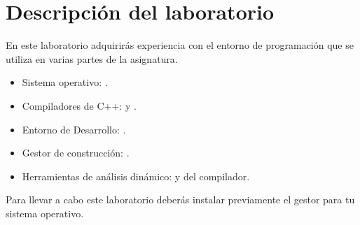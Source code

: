 \section{Descripción del laboratorio}

En este laboratorio adquirirás experiencia con el entorno de programación que se
utiliza en varias partes de la asignatura.

\begin{itemize}

  \item Sistema operativo: .

  \item Compiladores de C++:  y .

  \item Entorno de Desarrollo: .

  \item Gestor de construcción: .

  \item Herramientas de análisis dinámico:  y
 del compilador.

\end{itemize}

Para llevar a cabo este laboratorio deberás instalar previamente el gestor
 para tu sistema operativo.
